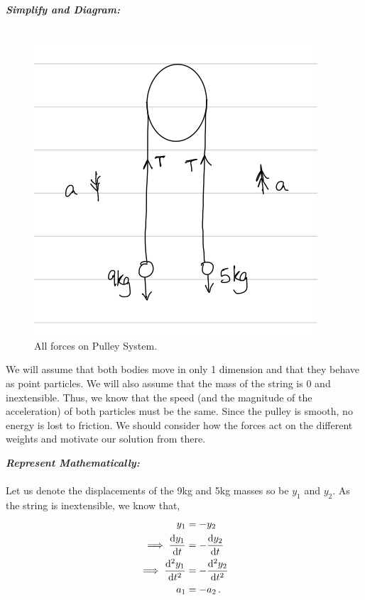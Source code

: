 \begin{subquestions}
\begin{subsubquestions}
\textbf{\textit{Simplify and Diagram:}} \\ \\
\begin{figure}[H]
	\begin{center}
		\includegraphics[scale=0.25]{../2013/figures/2013q6-1}
		\caption{\label{2013:q6:Diagram1} All forces on Pulley System.}
	\end{center}
\end{figure}
We will assume that both bodies move in only 1 dimension and that they behave as point particles. We will also assume that the mass of the string is 0 and inextensible. Thus, we know that the speed (and the magnitude of the acceleration) of both particles must be the same. Since the pulley is smooth, no energy is lost to friction. We should consider how the forces act on the different weights and motivate our solution from there.




\textbf{\textit{Represent Mathematically:}} \\ \\ 
Let us denote the displacements of the 9kg and 5kg masses so be $y_1$ and $y_2$. As the string is inextensible, we know that,
\begin{align}
	y_1 & = -y_2 \nonumber \\
	\implies \frac{\mathrm{d}y_1}{\mathrm{d}t} & = -\frac{\mathrm{d}y_2}{\mathrm{d}t} \nonumber \\
	\implies \frac{\mathrm{d}^2y_1}{\mathrm{d}t^2} & = -\frac{\mathrm{d}^2y_2}{\mathrm{d}t^2} \nonumber \\
	a_1 & = -a_2 \,.
\end{align}


\end{subsubquestions}
\end{subquestions}
